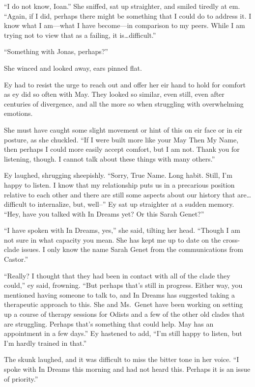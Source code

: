 ``I do not know, Ioan.'' She sniffed, sat up straighter, and smiled tiredly at em. ``Again, if I did, perhaps there might be something that I could do to address it. I know what I am—what I have become—in comparison to my peers. While I am trying not to view that as a failing, it is\ldots difficult.''

``Something with Jonas, perhaps?''

She winced and looked away, ears pinned flat.

Ey had to resist the urge to reach out and offer her eir hand to hold for comfort as ey did so often with May. They looked so similar, even still, even after centuries of divergence, and all the more so when struggling with overwhelming emotions.

She must have caught some slight movement or hint of this on eir face or in eir posture, as she chuckled. ``If I were built more like your May Then My Name, then perhaps I could more easily accept comfort, but I am not. Thank you for listening, though. I cannot talk about these things with many others.''

Ey laughed, shrugging sheepishly. ``Sorry, True Name. Long habit. Still, I'm happy to listen. I know that my relationship puts us in a precarious position relative to each other and there are still some aspects about our history that are\ldots difficult to internalize, but, well--'' Ey sat up straighter at a sudden memory. ``Hey, have you talked with In Dreams yet? Or this Sarah Genet?''

``I have spoken with In Dreams, yes,'' she said, tilting her head. ``Though I am not sure in what capacity you mean. She has kept me up to date on the cross-clade issues. I only know the name Sarah Genet from the communications from Castor.''

``Really? I thought that they had been in contact with all of the clade they could,'' ey said, frowning. ``But perhaps that's still in progress. Either way, you mentioned having someone to talk to, and In Dreams has suggested taking a therapeutic approach to this. She and Ms.~Genet have been working on setting up a course of therapy sessions for Odists and a few of the other old clades that are struggling. Perhaps that's something that could help. May has an appointment in a few days.'' Ey hastened to add, ``I'm still happy to listen, but I'm hardly trained in that.''

The skunk laughed, and it was difficult to miss the bitter tone in her voice. ``I spoke with In Dreams this morning and had not heard this. Perhaps it is an issue of priority.''

